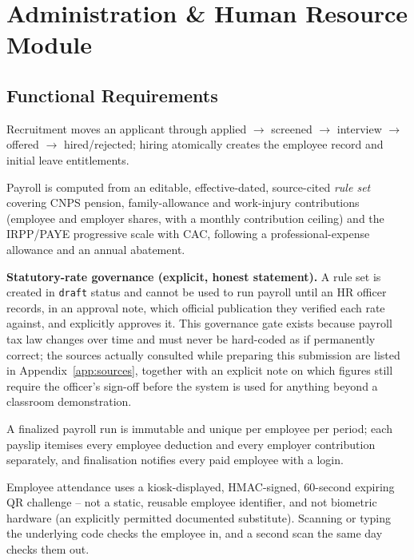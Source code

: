 \section{Administration \& Human Resource Module}
\label{sec:hr-module}

\subsection{Functional Requirements}
\begin{reqlist}
  \setcounter{reqlisti}{19}
  \item Recruitment moves an applicant through
    applied $\to$ screened $\to$ interview $\to$ offered $\to$ hired/rejected;
    hiring atomically creates the employee record and initial leave
    entitlements.
  \item Payroll is computed from an editable, effective-dated, source-cited
    \emph{rule set} covering CNPS pension, family-allowance and work-injury
    contributions (employee and employer shares, with a monthly
    contribution ceiling) and the IRPP/PAYE progressive scale with CAC,
    following a professional-expense allowance and an annual abatement.
  \item \textbf{Statutory-rate governance (explicit, honest statement).} A
    rule set is created in \texttt{draft} status and cannot be used to run
    payroll until an HR officer records, in an approval note, which official
    publication they verified each rate against, and explicitly approves it.
    This governance gate exists because payroll tax law changes over time and
    must never be hard-coded as if permanently correct; the sources actually
    consulted while preparing this submission are listed in
    Appendix~\ref{app:sources}, together with an explicit note on which
    figures still require the officer's sign-off before the system is used
    for anything beyond a classroom demonstration.
  \item A finalized payroll run is immutable and unique per employee per
    period; each payslip itemises every employee deduction and every
    employer contribution separately, and finalisation notifies every paid
    employee with a login.
  \item Employee attendance uses a kiosk-displayed, HMAC-signed, 60-second
    expiring QR challenge -- not a static, reusable employee identifier, and
    not biometric hardware (an explicitly permitted documented substitute).
    Scanning or typing the underlying code checks the employee in, and a
    second scan the same day checks them out.

\end{reqlist}
